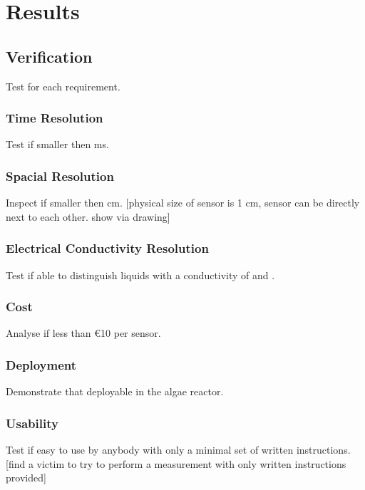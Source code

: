 \chapter{Results}

\section{Verification}

Test for each requirement.

\subsection{Time Resolution}

Test if smaller then \unit[1]{ms}.

\subsection{Spacial Resolution}

Inspect if smaller then \unit[1]{cm}. [physical size of sensor is 1 cm, sensor can be directly next to each other. show via drawing]

\subsection{Electrical Conductivity Resolution}

Test if able to distinguish liquids with a conductivity of  and .

\subsection{Cost}

Analyse if less than \euro{10} per sensor.

\subsection{Deployment}

Demonstrate that deployable in the algae reactor.

\subsection{Usability}

Test if easy to use by anybody with only a minimal set of written instructions. [find a victim to try to perform a measurement with only written instructions provided]


